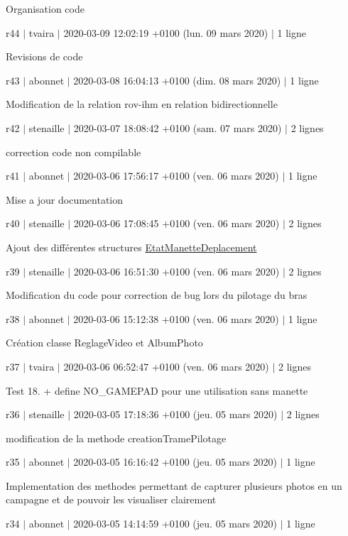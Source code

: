 Organisation code

r44 $\vert$ tvaira $\vert$ 2020-\/03-\/09 12\+:02\+:19 +0100 (lun. 09 mars 2020) $\vert$ 1 ligne

Revisions de code

r43 $\vert$ abonnet $\vert$ 2020-\/03-\/08 16\+:04\+:13 +0100 (dim. 08 mars 2020) $\vert$ 1 ligne

Modification de la relation rov-\/ihm en relation bidirectionnelle

r42 $\vert$ stenaille $\vert$ 2020-\/03-\/07 18\+:08\+:42 +0100 (sam. 07 mars 2020) $\vert$ 2 lignes

correction code non compilable

r41 $\vert$ abonnet $\vert$ 2020-\/03-\/06 17\+:56\+:17 +0100 (ven. 06 mars 2020) $\vert$ 1 ligne

Mise a jour documentation

r40 $\vert$ stenaille $\vert$ 2020-\/03-\/06 17\+:08\+:45 +0100 (ven. 06 mars 2020) $\vert$ 2 lignes

Ajout des différentes structures \hyperlink{struct_etat_manette_deplacement}{Etat\+Manette\+Deplacement}

r39 $\vert$ stenaille $\vert$ 2020-\/03-\/06 16\+:51\+:30 +0100 (ven. 06 mars 2020) $\vert$ 2 lignes

Modification du code pour correction de bug lors du pilotage du bras

r38 $\vert$ abonnet $\vert$ 2020-\/03-\/06 15\+:12\+:38 +0100 (ven. 06 mars 2020) $\vert$ 1 ligne

Création classe Reglage\+Video et Album\+Photo

r37 $\vert$ tvaira $\vert$ 2020-\/03-\/06 06\+:52\+:47 +0100 (ven. 06 mars 2020) $\vert$ 2 lignes

Test 18. + define N\+O\+\_\+\+G\+A\+M\+E\+P\+AD pour une utilisation sans manette

r36 $\vert$ stenaille $\vert$ 2020-\/03-\/05 17\+:18\+:36 +0100 (jeu. 05 mars 2020) $\vert$ 2 lignes

modification de la methode creation\+Trame\+Pilotage

r35 $\vert$ abonnet $\vert$ 2020-\/03-\/05 16\+:16\+:42 +0100 (jeu. 05 mars 2020) $\vert$ 1 ligne

Implementation des methodes permettant de capturer plusieurs photos en un campagne et de pouvoir les visualiser clairement

r34 $\vert$ abonnet $\vert$ 2020-\/03-\/05 14\+:14\+:59 +0100 (jeu. 05 mars 2020) $\vert$ 1 ligne

